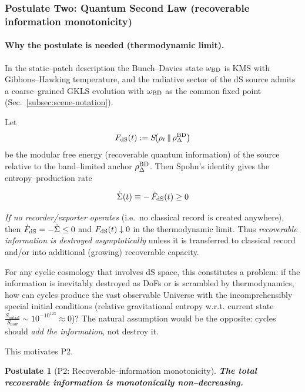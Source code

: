 \documentclass[10pt]{article}
\theoremstyle{definition}
\theoremstyle{plain}
\newtheorem{postulate}{Postulate}[section]
\begin{document}
\subsubsection*{Postulate Two: Quantum Second Law (recoverable information monotonicity)}
\label{subsubsec:P2}

\paragraph{Why the postulate is needed (thermodynamic limit).}\label{par:uom-main-016}
In the static–patch description the Bunch–Davies state $\omega_{\rm BD}$ is KMS \cite{BunchDavies1978} with Gibbons–Hawking temperature\cite{GibbonsHawking1977}, and the
radiative sector of the dS source admits a coarse–grained GKLS evolution with
$\omega_{\rm BD}$ as the common fixed point (Sec.~\ref{subsec:scene-notation}).


Let 
\[
F_{\rm dS}(t):=S\!\big(\rho_t\,\|\,\rho^{\rm BD}_\Delta\big)
\]
be the modular free
energy (recoverable quantum information) of the source relative to the band–limited
anchor $\rho^{\rm BD}_\Delta$. Then Spohn’s identity gives the entropy–production rate

\[
\dot{\Sigma}(t)\equiv-\,\dot F_{\rm dS}(t)\ge 0
\]

\emph{If no recorder/exporter operates}
(i.e.\ no classical record is created anywhere), then $\dot F_{\rm dS}=-\dot{\Sigma}\le0$ and
$F_{\rm dS}(t)\downarrow 0$ in the thermodynamic limit. Thus \emph{recoverable
information is destroyed asymptotically} unless it is transferred to classical record
and/or into additional (growing) recoverable capacity. 

For any cyclic cosmology that involves dS space, this constitutes a problem: if the information is inevitably destroyed as DoFs or is scrambled by thermodynamics, how can cycles produce the vast observable Universe with the incomprehensibly special initial conditions (relative gravitational entropy w.r.t. current state $\frac{S_{\text{initial}}}{S_{\text{now}}}\sim 10^{-10^{123}}\approx 0$)? The natural assumption would be the opposite: cycles should \emph{add the information}, not destroy it.

This motivates P2.

\begin{postulate}[P2: Recoverable–information monotonicity]
\label{post:P2}
\textbf{The total recoverable information is monotonically non–decreasing.}
\end{postulate}
\end{document}
